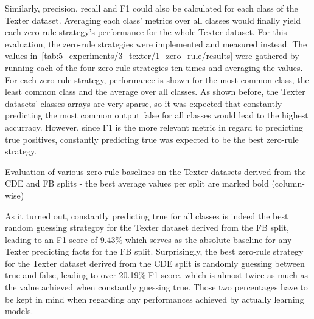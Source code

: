 Similarly, precision, recall and F1 could also be calculated for each class of the Texter dataset. Averaging each class' metrics over all classes would finally yield each zero-rule strategy's performance for the whole Texter dataset. For this evaluation, the zero-rule strategies were implemented and measured instead. The values in~\ref{tab:5_experiments/3_texter/1_zero_rule/results} were gathered by running each of the four zero-rule strategies ten times and averaging the values. For each zero-rule strategy, performance is shown for the most common class, the least common class and the average over all classes. As shown before, the Texter datasets' classes arrays are very sparse, so it was expected that constantly predicting the most common output false for all classes would lead to the highest accurracy. However, since F1 is the more relevant metric in regard to predicting true positives, constantly predicting true was expected to be the best zero-rule strategy.

\begin{table}[h]
    \makebox[\textwidth][c]{
        
    }
    \caption{Evaluation of various zero-rule baselines on the Texter datasets derived from the CDE and FB splits - the best average values per split are marked bold (column-wise)}
    \label{tab:5_experiments/3_texter/1_zero_rule/results}
\end{table}

As it turned out, constantly predicting true for all classes is indeed the best random guessing strategoy for the Texter dataset derived from the FB split, leading to an F1 score of 9.43\% which serves as the absolute baseline for any Texter predicting facts for the FB split. Surprisingly, the best zero-rule strategy for the Texter dataset derived from the CDE split is randomly guessing between true and false, leading to over 20.19\% F1 score, which is almost twice as much as the value achieved when constantly guessing true. Those two percentages have to be kept in mind when regarding any performances achieved by actually learning models.

